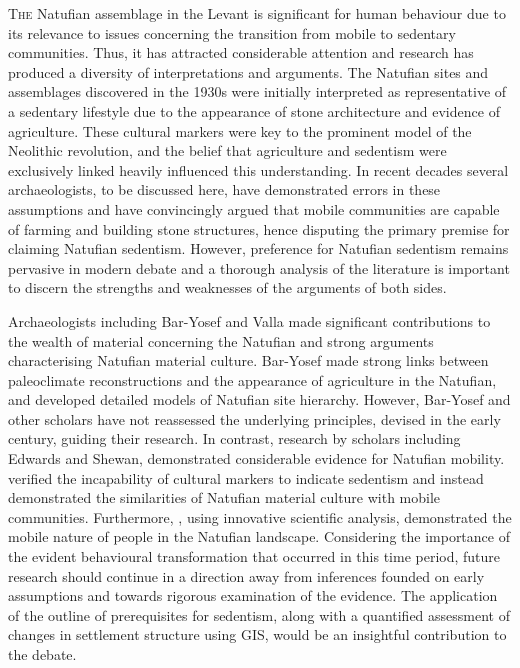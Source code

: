 \lettrine{T}{he} Natufian assemblage in the Levant is significant for human behaviour due to its relevance to issues concerning the transition from mobile to sedentary communities. Thus, it has attracted considerable attention and research has produced a diversity of interpretations and arguments. 
The Natufian sites and assemblages discovered in the 1930s were initially interpreted as representative of a sedentary lifestyle due to the appearance of stone architecture and evidence of agriculture. These cultural markers were key to the \textcite{Childe_1953} prominent model of the Neolithic revolution, and the belief that agriculture and sedentism were exclusively linked heavily influenced this understanding. In recent decades several archaeologists, to be discussed here, have demonstrated errors in these assumptions and have convincingly argued that mobile communities are capable of farming and building stone structures, hence disputing the primary premise for claiming Natufian sedentism. However, preference for Natufian sedentism remains pervasive in modern debate and a thorough analysis of the literature is important to discern the strengths and weaknesses of the arguments of both sides. 

Archaeologists including Bar-Yosef and Valla made significant contributions to the wealth of material concerning the Natufian and strong arguments characterising Natufian material culture. Bar-Yosef made strong links between paleoclimate reconstructions and the appearance of agriculture in the Natufian, and developed detailed models of Natufian site hierarchy. However, Bar-Yosef and other scholars have not reassessed the underlying principles, devised in the early  century, guiding their research. In contrast, research by scholars including Edwards and Shewan, demonstrated considerable evidence for Natufian mobility. \textcite{Edwards_1989} verified the incapability of cultural markers to indicate sedentism and instead demonstrated the similarities of Natufian material culture with mobile communities. 
Furthermore, \textcite{Shewan_2004}, using innovative scientific analysis, demonstrated the mobile nature of people in the Natufian landscape. 
Considering the importance of the evident behavioural transformation that occurred in this time period, future research should continue in a direction away from inferences founded on early assumptions and towards rigorous examination of the evidence. The application of the \textcite{Fletcher_2007} outline of prerequisites for sedentism, along with a quantified assessment of changes in settlement structure using GIS, would be an insightful contribution to the debate.

